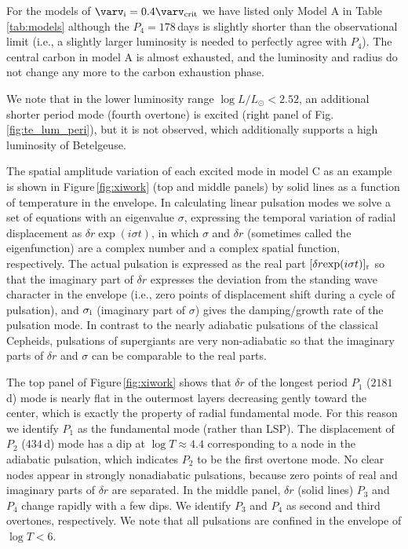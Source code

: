 \documentclass[fleqn,usenatbib]{mnras}
\begin{document}
For the models of $\varv_{\rm i}=0.4\varv_{\rm crit}$ we have listed only Model A in Table\,\ref{tab:models} although the $P_4=178$\,days is slightly shorter than the observational limit (i.e., a slightly larger luminosity is needed to perfectly agree with $P_4$). The central carbon in model A is almost exhausted, and the luminosity and radius do not change any more to the carbon exhaustion phase.

We note that in the lower luminosity range
 $\log L/L_\odot < 2.52$, an 
additional shorter period mode (fourth overtone) is excited
(right panel of Fig.\,\ref{fig:te_lum_peri}), but it is not observed,
 which additionally supports a high luminosity of Betelgeuse.

The spatial amplitude variation of each excited mode in model C as an example 
is shown in Figure\,\ref{fig:xiwork} (top and middle panels) 
by solid lines as a function of temperature in the envelope. 
In calculating linear pulsation modes we solve a set of equations 
with an eigenvalue $\sigma$, expressing the temporal variation of 
radial displacement as $\delta r\!\exp(i\sigma t)$, in which
$\sigma$ and $\delta r$ (sometimes called the eigenfunction) 
are a complex number and a complex spatial function, respectively.
The actual pulsation is expressed as the real part 
$[\delta r\!\exp(i\sigma t)]_{\rm r}$
so that the imaginary part of $\delta r$ expresses the deviation from the 
standing wave character in the envelope (i.e., zero points of displacement
shift during a cycle of pulsation), and $\sigma_{\rm i}$ 
(imaginary part of $\sigma$) gives the damping/growth rate 
of the pulsation mode. 
In contrast to the nearly adiabatic pulsations of the classical Cepheids,
pulsations of supergiants are very non-adiabatic so that
the imaginary parts of $\delta r$ and $\sigma$ can be comparable to 
the real parts.

The top panel of Figure\,\ref{fig:xiwork} shows that $\delta r$ 
of the longest period $P_1$ ($2181$\,d) mode is nearly flat in the
outermost layers decreasing gently toward the center, which is exactly the
property of radial fundamental mode. 
For this reason we identify $P_1$ as the fundamental mode (rather than LSP).
The displacement of $P_2$ ($434$\,d) mode has a dip at $\log T\approx 4.4$
corresponding to a node in the adiabatic pulsation, which indicates
$P_2$ to be the first overtone mode. 
No clear nodes appear in strongly nonadiabatic pulsations, 
because zero points of real and imaginary parts of 
$\delta r$ are separated.
In the middle panel, 
$\delta r$ (solid lines) $P_3$ and $P_4$ change rapidly with a few dips. 
We identify $P_3$ and $P_4$ as second and third overtones, respectively.
We note that all pulsations are confined in the envelope of $\log T < 6$.
\end{document}
